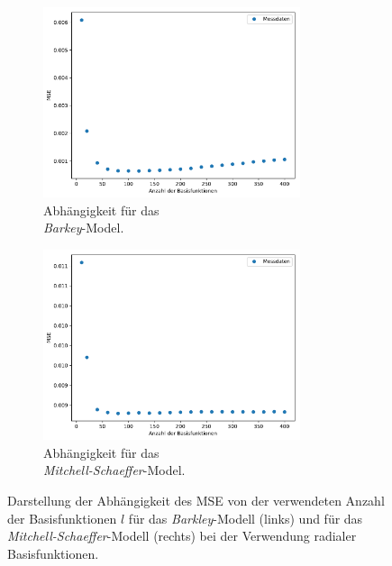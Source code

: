\begin{figure}[h]
	\centering
	\begin{subfigure}{.5\textwidth}
		\centering
		\includegraphics[height=2.2in]{figures/results/cross_prediction/rbf_placements_uv_mse.pdf}
		\setcapmargin[1cm]{1cm}
		\caption{Abhängigkeit für das \\ \textit{Barkey}-Model.}
		\label{fig:exp_cross_rbf_placements_mse_uv}
	\end{subfigure}%
	\begin{subfigure}{.5\textwidth}
		\centering
		\includegraphics[height=2.2in]{figures/results/cross_prediction/rbf_placements_vh_mse.pdf}
		\setcapmargin[1cm]{1cm}
  		\caption{Abhängigkeit für das \\ \textit{Mitchell-Schaeffer}-Model.}
  		\label{fig:exp_cross_rbf_placements_mse_vh}
	\end{subfigure}
	\caption{Darstellung der Abhängigkeit des MSE von der verwendeten Anzahl der Basisfunktionen $l$ für das \textit{Barkley}-Modell (links) und für das \textit{Mitchell-Schaeffer}-Modell (rechts) bei der Verwendung radialer Basisfunktionen.}
	\label{fig:exp_cross_rbf_placements_mse}
\end{figure}

\FloatBarrier
